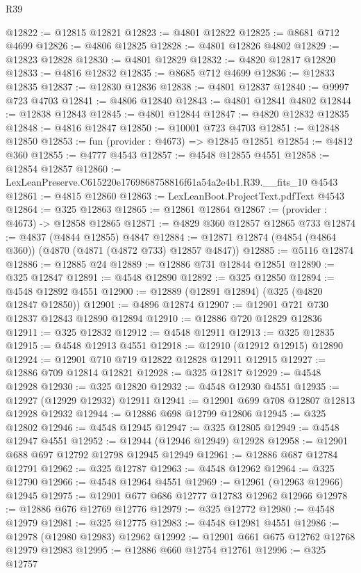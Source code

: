 \begin{lexlean}{R39}
\begin{coremodule}
@12822 := @12815 @12821
@12823 := @4801 @12822
@12825 := @8681 @712 @4699
@12826 := @4806 @12825
@12828 := @4801 @12826 @4802
@12829 := @12823 @12828
@12830 := @4801 @12829
@12832 := @4820 @12817 @12820
@12833 := @4816 @12832
@12835 := @8685 @712 @4699
@12836 := @12833 @12835
@12837 := @12830 @12836
@12838 := @4801 @12837
@12840 := @9997 @723 @4703
@12841 := @4806 @12840
@12843 := @4801 @12841 @4802
@12844 := @12838 @12843
@12845 := @4801 @12844
@12847 := @4820 @12832 @12835
@12848 := @4816 @12847
@12850 := @10001 @723 @4703
@12851 := @12848 @12850
@12853 := fun (provider : @4673) => @12845 @12851
@12854 := @4812 @360
@12855 := @4777 @4543
@12857 := @4548 @12855 @4551
@12858 := @12854 @12857
@12860 := LexLeanPreserve.C615220e1769868758816f61a54a2e4b1.R39.__fits_10 @4543
@12861 := @4815 @12860
@12863 := LexLeanBoot.ProjectText.pdfText @4543
@12864 := @325 @12863
@12865 := @12861 @12864
@12867 := (provider : @4673) -> @12858 @12865
@12871 := @4829 @360 @12857 @12865 @733
@12874 := @4837 (@4844 @12855) @4847
@12884 := @12871 @12874 (@4854 (@4864 @360)) (@4870 (@4871 (@4872 @733) @12857 @4847))
@12885 := @5116 @12874
@12886 := @12885 @24
@12889 := @12886 @731 @12844 @12851
@12890 := @325 @12847
@12891 := @4548 @12890
@12892 := @325 @12850
@12894 := @4548 @12892 @4551
@12900 := @12889 (@12891 @12894) (@325 (@4820 @12847 @12850))
@12901 := @4896 @12874
@12907 := @12901 @721 @730 @12837 @12843 @12890 @12894
@12910 := @12886 @720 @12829 @12836
@12911 := @325 @12832
@12912 := @4548 @12911
@12913 := @325 @12835
@12915 := @4548 @12913 @4551
@12918 := @12910 (@12912 @12915) @12890
@12924 := @12901 @710 @719 @12822 @12828 @12911 @12915
@12927 := @12886 @709 @12814 @12821
@12928 := @325 @12817
@12929 := @4548 @12928
@12930 := @325 @12820
@12932 := @4548 @12930 @4551
@12935 := @12927 (@12929 @12932) @12911
@12941 := @12901 @699 @708 @12807 @12813 @12928 @12932
@12944 := @12886 @698 @12799 @12806
@12945 := @325 @12802
@12946 := @4548 @12945
@12947 := @325 @12805
@12949 := @4548 @12947 @4551
@12952 := @12944 (@12946 @12949) @12928
@12958 := @12901 @688 @697 @12792 @12798 @12945 @12949
@12961 := @12886 @687 @12784 @12791
@12962 := @325 @12787
@12963 := @4548 @12962
@12964 := @325 @12790
@12966 := @4548 @12964 @4551
@12969 := @12961 (@12963 @12966) @12945
@12975 := @12901 @677 @686 @12777 @12783 @12962 @12966
@12978 := @12886 @676 @12769 @12776
@12979 := @325 @12772
@12980 := @4548 @12979
@12981 := @325 @12775
@12983 := @4548 @12981 @4551
@12986 := @12978 (@12980 @12983) @12962
@12992 := @12901 @661 @675 @12762 @12768 @12979 @12983
@12995 := @12886 @660 @12754 @12761
@12996 := @325 @12757

\end{coremodule}
\end{lexlean}
